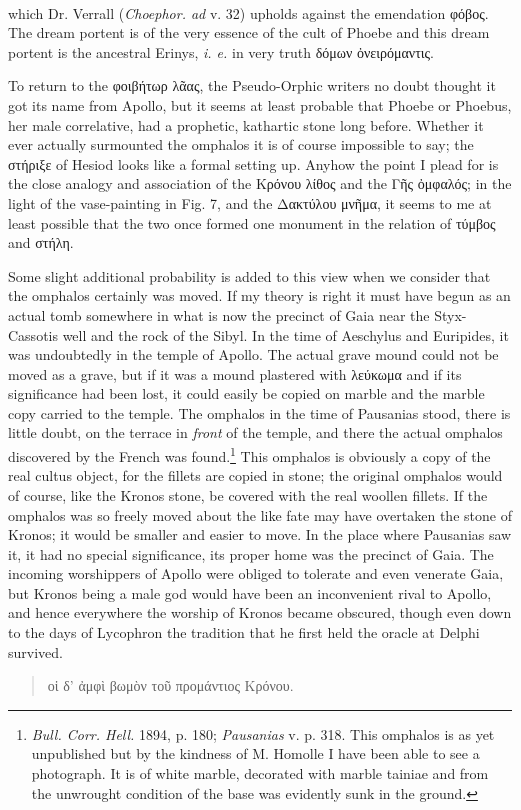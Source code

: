 \documentclass[a4paper, 11pt, oneside, polutonikogreek, english]{article}
\begin{document}
\paragraph{}
which Dr. Verrall (\emph{Choephor. ad} v. 32) upholds against the emendation φόβος. The dream portent is of the very essence of the cult of Phoebe and this dream portent is the ancestral Erinys, \emph{i. e.} in very truth δόμων ὀνειρόμαντις.

To return to the φοιβήτωρ λᾶας, the Pseudo-Orphic writers no doubt thought it got its name from Apollo, but it seems at least probable that Phoebe or Phoebus, her male correlative, had a prophetic, kathartic stone long before. Whether it ever actually surmounted the omphalos it is of course impossible to say; the στήριξε of Hesiod looks like a formal setting up. Anyhow the point I plead for is the close analogy and association of the Κρόνου λίθος and the Γῆς ὀμφαλός; in the light of the vase-painting in Fig. 7, and the Δακτύλου μνῆμα, it seems to me at least possible that the two once formed one monument in the relation of τύμβος and στήλη.

Some slight additional probability is added to this view when we consider that the omphalos certainly was moved. If my theory is right it must have begun as an actual tomb somewhere in what is now the precinct of Gaia near the Styx-Cassotis well and the rock of the Sibyl. In the time of Aeschylus and Euripides, it was undoubtedly in the temple of Apollo. The actual grave mound could not be moved as a grave, but if it was a mound plastered with λεύκωμα and if its significance had been lost, it could easily be copied on marble and the marble copy carried to the temple. The omphalos in the time of Pausanias stood, there is little doubt, on the terrace in \emph{front} of the temple, and there the actual omphalos discovered by the French was found.\footnote{\emph{Bull. Corr. Hell.} 1894, p. 180; \emph{Pausanias} v. p. 318. This omphalos is as yet unpublished but by the kindness of M. Homolle I have been able to see a photograph. It is of white marble, decorated with marble tainiae and from the unwrought condition of the base was evidently sunk in the ground.} This omphalos is obviously a copy of the real cultus object, for the fillets are copied in stone; the original omphalos would of course, like the Kronos stone, be covered with the real woollen fillets. If the omphalos was so freely moved about the like fate may have overtaken the stone of Kronos; it would be smaller and easier to move. In the place where Pausanias saw it, it had no special significance, its proper home was the precinct of Gaia. The incoming worshippers of Apollo were obliged to tolerate and even venerate Gaia, but Kronos being a male god would have been an inconvenient rival to Apollo, and hence everywhere the worship of Kronos became obscured, though even down to the days of Lycophron the tradition that he first held the oracle at Delphi survived.
\begin{quotation}
οἱ δ' ἀμφὶ βωμὸν τοῦ προμάντιος Κρόνου.
\end{quotation}
\end{document}
